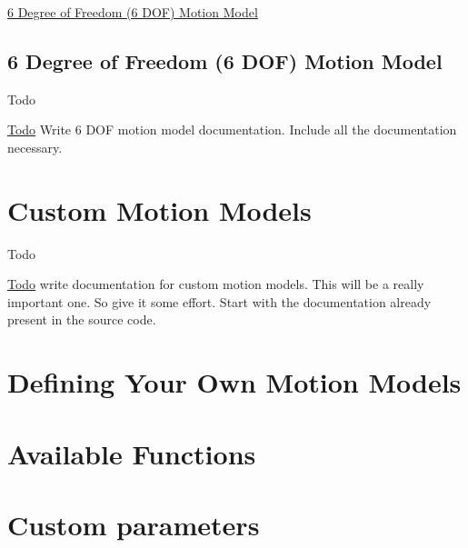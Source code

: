 \hyperlink{sixdof}{6 Degree of Freedom (6 D\-O\-F) Motion Model} \hypertarget{sixdof}{}\subsection{6 Degree of Freedom (6 D\-O\-F) Motion Model}\label{sixdof}
\begin{DoxyRefDesc}{Todo}
\item[\hyperlink{todo__todo000041}{Todo}]Write 6 D\-O\-F motion model documentation. Include all the documentation necessary.\end{DoxyRefDesc}
\hypertarget{custom_motion_models}{}\section{Custom Motion Models}\label{custom_motion_models}
\begin{DoxyRefDesc}{Todo}
\item[\hyperlink{todo__todo000040}{Todo}]write documentation for custom motion models. This will be a really important one. So give it some effort. Start with the documentation already present in the source code.\end{DoxyRefDesc}


\section*{Defining Your Own Motion Models}

\section*{Available Functions}

\section*{Custom parameters}